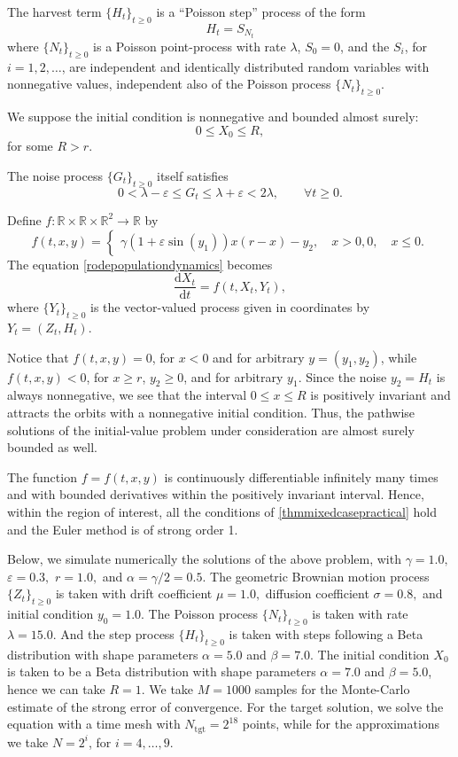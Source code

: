 \documentclass[reqno,12pt]{amsart}
\theoremstyle{plain} %
\theoremstyle{definition} %
\begin{document}
The harvest term $\{H_t\}_{t\geq 0}$ is a ``Poisson step'' process of the form
\[
    H_t = S_{N_t}
\]
where $\{N_t\}_{t\geq 0}$ is a Poisson point-process with rate $\lambda$, $S_0 = 0$, and the $S_i$, for $i=1, 2, \ldots$, are independent and identically distributed random variables with nonnegative values, independent also of the Poisson process $\{N_t\}_{t\geq 0}$.

We suppose the initial condition is nonnegative and bounded almost surely:
\[
    0 \leq X_0 \leq R,
\]
for some $R > r$.

The noise process $\{G_t\}_{t \geq 0}$ itself satisfies
\[
    0 < \lambda - \varepsilon \leq G_t \leq \lambda + \varepsilon < 2\lambda, \qquad \forall t \geq 0.
\]

Define $f:\mathbb{R} \times \mathbb{R} \times \mathbb{R}^2 \rightarrow \mathbb{R}$ by
\[
    f(t, x, y) = \begin{cases}
        \gamma (1 + \varepsilon \sin(y_1)) x(r - x) - y_2, \quad x > 0,
        0, \quad x \leq 0.
    \end{cases}
\]
The equation \eqref{rodepopulationdynamics} becomes
\[
    \frac{\mathrm{d}X_t}{\mathrm{d}t} = f(t, X_t, Y_t),
\]
where $\{Y_t\}_{t\geq 0}$ is the vector-valued process given in coordinates by $Y_t = (Z_t, H_t)$.

Notice that $f(t, x, y) = 0$, for $x < 0$ and for arbitrary $y=(y_1, y_2)$, while $f(t, x, y) < 0$, for $x \geq r$, $y_2 \geq 0$, and for arbitrary $y_1$. Since the noise $y_2 = H_t$ is always nonnegative, we see that the interval $0 \leq x \leq R$ is positively invariant and attracts the orbits with a nonnegative initial condition. Thus, the pathwise solutions of the initial-value problem under consideration are almost surely bounded as well.

The function $f=f(t, x, y)$ is continuously differentiable infinitely many times and with bounded derivatives within the positively invariant interval. Hence, within the region of interest, all the conditions of \cref{thmmixedcasepractical} hold and the Euler method is of strong order 1.

Below, we simulate numerically the solutions of the above problem, with $\gamma = 1.0,$ $\varepsilon = 0.3,$ $r = 1.0,$ and $\alpha = \gamma/2 = 0.5.$ The geometric Brownian motion process $\{Z_t\}_{t\geq 0}$ is taken with drift coefficient $\mu = 1.0,$ diffusion coefficient $\sigma = 0.8,$ and initial condition $y_0 = 1.0.$ The Poisson process $\{N_t\}_{t \geq 0}$ is taken with rate $\lambda = 15.0$. And the step process $\{H_t\}_{t \geq 0}$ is taken with steps following a Beta distribution with shape parameters $\alpha = 5.0$ and $\beta = 7.0$. The initial condition $X_0$ is taken to be a Beta distribution with shape parameters $\alpha = 7.0$ and $\beta = 5.0$, hence we can take $R = 1$. We take $M=1000$ samples for the Monte-Carlo estimate of the strong error of convergence. For the target solution, we solve the equation with a time mesh with $N_{\mathrm{tgt}} = 2^{18}$ points, while for the approximations we take $N = 2^i$, for $i=4, \ldots, 9$.
\end{document}
